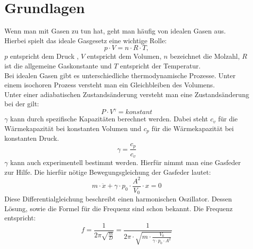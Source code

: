 \documentclass[12pt,a4paper,]{scrreprt}
\begin{document}
\section{Grundlagen}
Wenn man mit Gasen zu tun hat, geht man häufig von idealen Gasen aus. Hierbei spielt das ideale Gasgesetz eine wichtige Rolle:\\
\begin{equation}
p\cdot V=n\cdot R\cdot T,
\end{equation}
$p$ entspricht dem Druck , $V$ entspricht dem Volumen, $n$ bezeichnet die Molzahl, $R$ ist die allgemeine Gaskonstante und $T$ entspricht der Temperatur.\\
Bei idealen Gasen gibt es unterschiedliche thermodynamische Prozesse. Unter einem isochoren Prozess versteht man ein Gleichbleiben des Volumens. \\
Unter einer adiabatischen Zustandsänderung versteht man eine Zustandsänderung bei der gilt:
\begin{equation}
P\cdot V^\gamma = konstant
\end{equation}
$\gamma$ kann durch spezifische Kapazitäten berechnet werden. Dabei steht $c_v$ für die Wärmekapazität bei konstanten Volumen und $c_p$ für die Wärmekapazität bei konstanten Druck.\\
\begin{equation}
	\gamma = \frac{c_p}{c_v}
\end{equation}
$\gamma$ kann auch experimentell bestimmt werden. Hierfür nimmt man eine Gasfeder zur Hilfe. Die hierfür nötige Bewegungsgleichung der Gasfeder lautet:\\
\begin{equation}
m \cdot \ddot{x} + \gamma \cdot p_0 \cdot  \frac{A^2}{V_0 } \cdot x=0 
\end{equation}
Diese Differentialgleichung beschreibt einen harmonischen Oszillator. Dessen Lösung, sowie die Formel für die Frequenz sind schon bekannt.
Die Frequenz entspricht:\\
\begin{equation}
f = \frac{1}{2\pi \sqrt{\frac{m}{D}}}= \frac{1}{2 \pi \cdot \sqrt{m \cdot \frac{V_0}{ \gamma \cdot p_0 \cdot A^2}}}
\end{equation}
\end{document}
